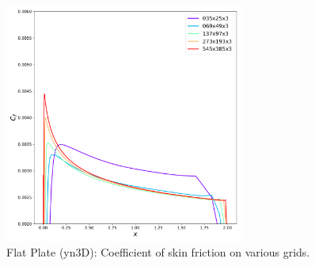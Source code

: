\begin{figure}[ht!]
\centering
  \includegraphics[width=0.7\textwidth]{figs/flat/skin_friction_grid.pdf}
  \caption{Flat Plate (yn3D): Coefficient of skin friction on various grids.}
  \label{fig:synflatcfstudy}
\end{figure}

